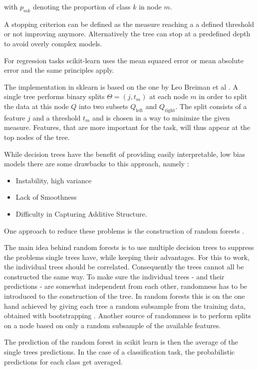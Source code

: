 with $p_{mk}$ denoting the proportion of class $k$ in node $m$.

A stopping criterion can be defined as the measure reaching a
a defined threshold or not improving anymore.
Alternatively the tree can stop at a predefined depth to
avoid overly complex models.

For regression tasks scikit-learn uses the mean squared error
or mean absolute error and the same principles apply.

The implementation in sklearn is based on the one by
Leo Breiman et al \cite{breimanclassification}.
A single tree performs binary splits $\Theta = (j, t_m)$
at each node $m$ in order to split
the data at this node $Q$ into two subsets
$Q_\text{left}$
and
$Q_\text{right}$.
The split consists of a feature $j$ and a threshold $t_m$ and is
chosen in a way to minimize the given measure.
Features, that are more important for the task, will
thus appear at the top nodes of the tree.


While decision trees have the benefit of providing
easily interpretable, low bias models there are some drawbacks to this
approach, namely \cite{hastie2017springer}:
\begin{itemize}
  \item{Instability, high variance}
  \item{Lack of Smoothness}
  \item{Difficulty in Capturing Additive Structure}.
\end{itemize}

One approach to reduce these problems is the construction of
random forests \cite{Breiman2001}.

The main idea behind random forests is to use multiple
decision trees to suppress the problems single trees have, while
keeping their advantages.
For this to work, the individual trees should  be correlated.
Consequently the trees cannot all be constructed the same way.
To make sure the individual trees
- and their predictions -
are somewhat independent from each other,
randomness has to be introduced to the construction of the tree.
In random forests this is on the one hand achieved by giving each tree a
random subsample from the training data, obtained with bootstrapping \cite{efron1992bootstrap}.
Another source of randomness is to perform splits on a node
based on only a random subsample of the available features.

The prediction of the random forest in scikit learn is then the average of
the single trees predictions.
In the case of a classification task, the probabilistic predictions for each class
get averaged.
